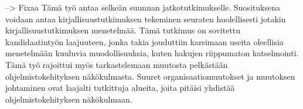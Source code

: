 --> Fixaa
Tämä työ antaa selkeän suunnan jatkotutkimukselle. Suosituksena voidaan antaa
kirjallisuustutkimuksen tekeminen seuraten huolellisesti jotakin
kirjallisuustutkimuksen menetelmää. Tämä tutkimus on sovitettu kandidaatintyön
laajuuteen, jonka takia jouduttiin karsimaan useita oleellisia menetelmään
kuuluvia muodollisuuksia, kuten hakujen riippumaton katselmointi. Tämä työ
rajoittui myös tarkastelemaan muutosta pelkästään ohjelmistokehityksen
näkökulmasta. Suuret organisaatiomuutokset ja muutoksen johtaminen ovat laajalti
tutkittuja alueita, joita pitäisi yhdistää ohjelmistokehityksen näkökulmaan.


